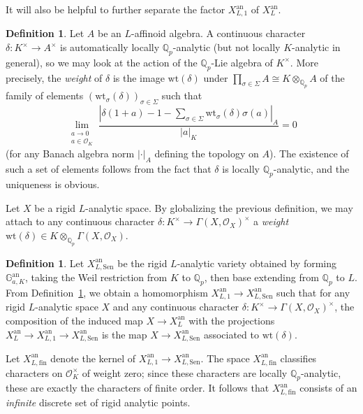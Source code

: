 \documentclass[12pt]{article}
\theoremstyle{definition}
\newtheorem{defn}[theorem]{Definition}
\numberwithin{equation}{theorem}
\newcommand{\calO}{\mathcal{O}}
\newcommand{\QQ}{\mathbb{Q}}
\newcommand{\an}{\mathrm{an}}
\def\Qp{\QQ_p}
\begin{document}
It will also be helpful to further separate the factor $X^{\an}_{L,1}$
of $X^{\an}_L$.
\begin{defn}\label{D:weight}
Let $A$ be an $L$-affinoid algebra.
A continuous character $\delta: K^\times \to A^\times$ is
automatically locally $\Qp$-analytic \cite[Proposition~8.3]{buzzard}
(but not locally $K$-analytic in general), so we may look at the
action of the $\Qp$-Lie algebra of $K^\times$.  More precisely, the
\emph{weight} of $\delta$ is the image $\mathrm{wt}(\delta)$ under
$\prod_{\sigma \in \Sigma} A \cong K \otimes_{\Qp} A$ of the family of
elements $(\mathrm{wt}_{\sigma}(\delta))_{\sigma \in \Sigma}$ such
that
\[
\lim_{\substack{a \to 0 \\ a \in \calO_K}} \frac{|\delta( 1+a) - 1 - \sum_{\sigma \in \Sigma} \mathrm{wt}_\sigma(\delta)\sigma(a)|_A}{|a|_K} = 0
\]
(for any Banach algebra norm $|\cdot|_A$ defining the topology on
$A$).  The existence of such a set of elements follows from the fact
that $\delta$ is locally $\Qp$-analytic, and the uniqueness is
obvious.

Let $X$ be a rigid $L$-analytic space. By globalizing the previous definition, we may attach to any continuous character $\delta: K^\times \to \Gamma(X, \calO_X)^\times$ a \emph{weight} $\mathrm{wt}(\delta) \in K \otimes_{\Qp} \Gamma(X, \calO_X)$.
\end{defn}

\begin{defn} \label{D:Sen weight space}
Let $X^{\an}_{L,\mathrm{Sen}}$ be the rigid $L$-analytic variety obtained by forming
$\mathbb{G}^{\an}_{a,K}$, taking the Weil restriction from $K$ to $\Qp$, then base extending from $\Qp$ to $L$.
From Definition~\ref{D:weight},
we obtain a homomorphism $X^{\an}_{L,1} \to X^{\an}_{L,\mathrm{Sen}}$
such that for any rigid $L$-analytic space $X$ and any continuous character $\delta: K^\times \to \Gamma(X, \calO_X)^\times$,
the composition of the induced map $X \to X^{\an}_L$ with the projections $X^{\an}_L \to X^{\an}_{L,1} \to X^{\an}_{L,\mathrm{Sen}}$
is the map $X \to X^{\an}_{L,\mathrm{Sen}}$ associated to $\mathrm{wt}(\delta)$.

Let $X^{\an}_{L,\mathrm{fin}}$ denote the kernel of 
$X^{\an}_{L,1} \to X^{\an}_{L,\mathrm{Sen}}$.
The space $X^{\an}_{L,\mathrm{fin}}$ classifies characters on $\calO_K^\times$ of weight zero; since these characters are locally $\Qp$-analytic, these are exactly the characters of finite order. It follows that $X^{\an}_{L,\mathrm{fin}}$ consists of an \emph{infinite} discrete set of rigid analytic points.
\end{defn}
\end{document}
